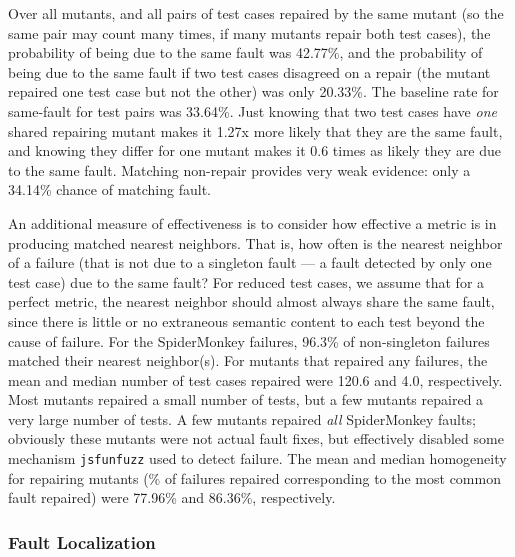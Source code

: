 Over all mutants, and all pairs of test cases repaired by the same mutant (so the same pair may count many times, if many mutants repair both test cases), the probability of being due to the same fault was 42.77\%, and the probability of being due to the same fault if two test cases disagreed on a repair (the mutant repaired one test case but not the other) was only 20.33\%.  The baseline rate for same-fault for test pairs was 33.64\%.  Just knowing that two test cases have \emph{one} shared repairing mutant makes it 1.27x more likely that they are the same fault, and knowing they differ for one mutant makes it 0.6 times as likely they are due to the same fault.  Matching non-repair provides very weak evidence:  only a 34.14\% chance of matching fault.

An additional measure of effectiveness is to consider how effective a metric is in producing matched nearest neighbors.  That is, how often is the nearest neighbor of a failure (that is not due to a singleton fault --- a fault detected by only one test case) due to the same fault?  For reduced \cite{DD,PLDI13,
CReduce} test cases, we assume that for a perfect metric, the nearest neighbor should almost always share the same fault, since there is little or no extraneous semantic content to each test beyond the cause of failure.  For the SpiderMonkey failures, 96.3\% of non-singleton failures matched their nearest neighbor(s).  For mutants that repaired any failures, the mean and median number of test cases repaired were 120.6 and 4.0, respectively.  Most mutants repaired a small number of tests, but a few mutants repaired a very large number of tests.  A few mutants repaired \emph{all} SpiderMonkey faults; obviously these mutants were not actual fault fixes, but effectively disabled some mechanism {\tt jsfunfuzz} used to detect failure. The mean and median homogeneity for repairing mutants (\% of failures repaired corresponding to the most common fault repaired) were 77.96\% and 86.36\%, respectively.  

\subsubsection{Fault Localization}

